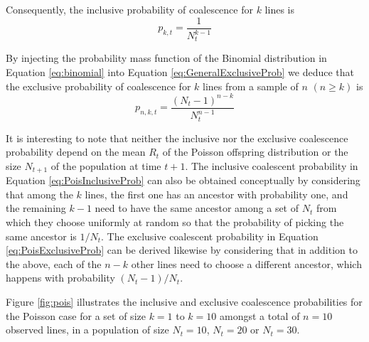 \documentclass{article}
\renewcommand{\eqref}[1]{\ref{#1}}
\begin{document}
Consequently, the inclusive probability of coalescence for $k$ lines is
\begin{equation}
	p_{k,t}=\frac{1}{N_t^{k-1}}\label{eq:PoisInclusiveProb}
\end{equation}

By injecting the probability mass function of the Binomial distribution in
Equation \eqref{eq:binomial} into Equation 
\eqref{eq:GeneralExclusiveProb} we deduce that 
the exclusive probability of coalescence for $k$ lines from a sample of $n$ $(n \geq k)$ is
	\begin{equation}
		p_{n,k,t} = \frac{(N_t-1)^{n-k}}{N_t^{n-1}}\label{eq:PoisExclusiveProb}
	\end{equation}
	
It is interesting to note that neither the inclusive nor the exclusive coalescence probability
depend on the mean $R_t$ of the Poisson offspring distribution or the size $N_{t+1}$
of the population at time $t+1$.
The inclusive coalescent probability in Equation \eqref{eq:PoisInclusiveProb}
can also be obtained conceptually by considering
that among the $k$ lines, the first one has an ancestor with probability one, 
and the remaining $k-1$ need to have the same ancestor among a set of $N_t$ from
which they choose uniformly at random so that the probability of picking the same ancestor
is $1/N_t$. The exclusive coalescent probability in Equation \eqref{eq:PoisExclusiveProb} 
can be derived likewise by considering
that in addition to the above, each of the $n-k$ other lines need to choose a different
ancestor, which happens with probability $(N_t-1)/N_t$.

Figure \ref{fig:pois} illustrates the inclusive and exclusive coalescence probabilities for
the Poisson case for a set of size $k=1$ to $k=10$ amongst a total of $n=10$ observed
lines, in a population of size $N_t=10$, $N_t=20$ or $N_t=30$. 
\end{document}
